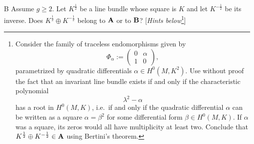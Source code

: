 \documentclass[A4paper, 12pt, british, reqno]{amsart}
\newcommand{\op}{\oplus}
\begin{document}
\begin{cexe}{B}
    Assume $g\geqslant 2$.
    Let $K^{\frac{1}{2}}$ be a line bundle whose square is $K$ and let $K^{-\frac{1}{2}}$ be its inverse.
    Does $K^{\frac{1}{2}}\op K^{-\frac{1}{2}}$ belong to $\mathbf{A}$ or to $\mathbf{B}$?
    [\textit{Hints below}\footnote{Consider the family of traceless endomorphisms given by 
    $$\Phi_{\alpha}:=\begin{pmatrix} 0 & \alpha \\ 1 & 0 \end{pmatrix},$$
	parametrized by quadratic differentials $\alpha\in H^{0}(M,K^{2})$. Use without proof the fact that an invariant line bundle exists if and only if the characteristic polynomial
	$$\lambda^{2}-\alpha$$
	has a root in $H^{0}(M,K)$, i.e.~if and only if the quadratic differential $\alpha$ can be written as a square $\alpha=\beta^{2}$ for some differential form $\beta\in H^{0}(M,K)$. If $\alpha$ was a square, its zeros would all have multiplicity at least two. Conclude that $K^{\frac{1}{2}}\op K^{-\frac{1}{2}}\in \bfA$ using Bertini's theorem.}]
\end{cexe}
\end{document}
